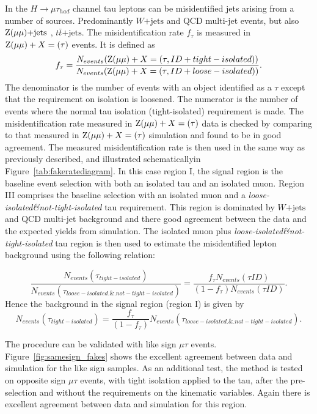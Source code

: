 \documentclass[oneside, letterpaper, oldfontcommands]{memoir}
\begin{document}
{{{In the $H \rightarrow \mu \tau_{had}$ channel tau leptons can be misidentified jets arising from a number of sources. Predominantly  $W\mathrm{+jets}$ and QCD multi-jet events, but also
 $\mathrm{Z}(\mu \mu) \mathrm{+jets}$ , $t\bar{t} \mathrm{+jets}$. The misidentification rate $f_{\tau}$ is measured in $\mathrm{Z}(\mu \mu) +X=(\tau)$ events. It is
defined as
\begin{equation*}
f_{\tau}= \frac{N_{events}(\mathrm{Z}(\mu \mu) +X=(\tau, ID+tight-isolated))}
               {N_{events}(\mathrm{Z}(\mu \mu) +X=(\tau, ID+loose-isolated))}.
\end{equation*}
The denominator is the number of events with an object identified as a $\tau$
except that the requirement on isolation is loosened. The
numerator is the number of events where the normal tau isolation (tight-isolated) requirement is made.
The misidentification rate  measured in  $\mathrm{Z}(\mu \mu) +X=(\tau)$ data is checked by comparing to that
measured in $\mathrm{Z}(\mu \mu) +X=(\tau)$ simulation and found to be in good agreement.
The measured misidentification rate is then used in the same way as previously described, and illustrated schematicallyin Figure~\ref{tab:fakeratediagram}. In this case region I, the signal region is the baseline
event selection with both an isolated tau and an isolated muon. Region III comprises the baseline
selection with an isolated muon and a {\it loose-isolated\&not-tight-isolated} tau  requirement.
This region is dominated by $W\mathrm{+jets}$ and QCD multi-jet background and there good agreement between the
data and the expected yields from simulation. The isolated muon plus
{\it loose-isolated\&not-tight-isolated} tau  region is then used  to estimate the misidentified lepton  background using the following relation:

\begin{equation*}
\frac{N_{events}(\tau_{tight-isolated})}
     {N_{events}(\tau_{loose-isolated.\&.not-tight-isolated})}
= 
\frac{f_{\tau}N_{events}(\tau ID)}
     {(1-f_{\tau})N_{events}(\tau ID)}.
\end{equation*}
Hence the background in the signal region (region I) is given by
\begin{equation*}
N_{events}(\tau_{ tight-isolated})= 
\frac{f_{\tau}}
     {(1-f_{\tau})}N_{events}(\tau_{loose-isolated.\&.not-tight-isolated}).
\end{equation*}

The procedure can be validated with like sign $\mu\tau$ events. Figure~\ref{fig:samesign_fakes}
shows the excellent agreement between data and simulation for the like sign samples.
As an additional test, the method is tested on opposite sign $\mu\tau$ events, with tight
isolation applied to the tau, after the pre-selection and without the requirements on the kinematic variables.
Again there is excellent agreement between  data and simulation for this region.

}}}
\end{document}
